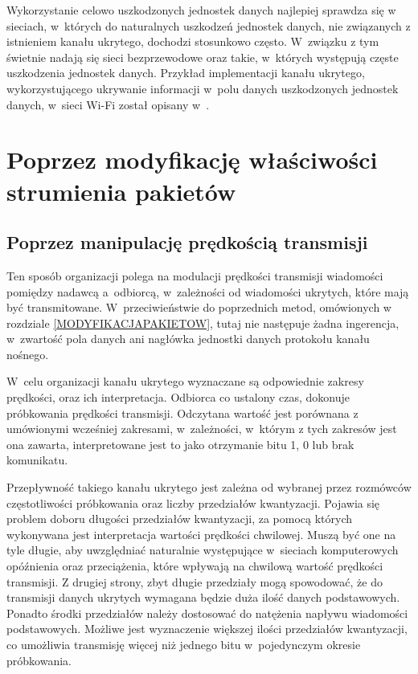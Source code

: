 \documentclass[a4paper, twoside, openright, 12pt]{report}
\begin{document}
        Wykorzystanie celowo uszkodzonych jednostek danych najlepiej sprawdza się w
        sieciach, w~których do naturalnych uszkodzeń jednostek danych, nie związanych z
        istnieniem kanału ukrytego, dochodzi stosunkowo często. W~związku z tym
        świetnie nadają się sieci bezprzewodowe oraz takie, w~których występują
        częste uszkodzenia jednostek danych. Przykład implementacji kanału ukrytego, wykorzystującego
        ukrywanie informacji w~polu danych uszkodzonych jednostek danych, w~sieci Wi-Fi
        został opisany w~\cite{HICCUPS}.

    \section{Poprzez modyfikację właściwości strumienia pakietów} \label{MODYFIKACJASTRUMIENIA}
        \subsection{Poprzez manipulację prędkością transmisji}
        Ten sposób organizacji polega na modulacji prędkości transmisji wiadomości
        pomiędzy nadawcą a~odbiorcą, w~zależności od wiadomości ukrytych, które mają
        być transmitowane. W~przeciwieństwie do poprzednich
        metod, omówionych w rozdziale \ref{MODYFIKACJAPAKIETOW}, tutaj nie następuje
        żadna ingerencja, w~zwartość pola danych ani nagłówka jednostki danych protokołu
        kanału nośnego.

        W~celu organizacji kanału ukrytego wyznaczane są odpowiednie zakresy prędkości, oraz ich
        interpretacja. Odbiorca co ustalony czas, dokonuje próbkowania prędkości
        transmisji. Odczytana wartość jest porównana z umówionymi wcześniej zakresami,
        w~zależności, w~którym z tych zakresów jest ona zawarta, interpretowane jest to
        jako otrzymanie bitu 1, 0 lub brak komunikatu.

        Przepływność takiego kanału ukrytego jest zależna od wybranej przez rozmówców
        częstotliwości próbkowania oraz liczby przedziałów kwantyzacji. Pojawia się
        problem doboru długości przedziałów kwantyzacji, za pomocą których wykonywana
        jest interpretacja wartości
        prędkości chwilowej. Muszą być one na tyle długie, aby uwzględniać naturalnie
        występujące w~sieciach komputerowych opóźnienia oraz przeciążenia, które wpływają
        na chwilową wartość prędkości transmisji. Z drugiej strony, zbyt długie przedziały
        mogą spowodować, że do transmisji danych ukrytych wymagana będzie duża ilość danych
        podstawowych. Ponadto środki przedziałów należy dostosować do natężenia
        napływu wiadomości podstawowych. Możliwe jest wyznaczenie większej ilości
        przedziałów kwantyzacji, co umożliwia transmisję więcej niż jednego bitu w~pojedynczym
        okresie próbkowania.
\end{document}
